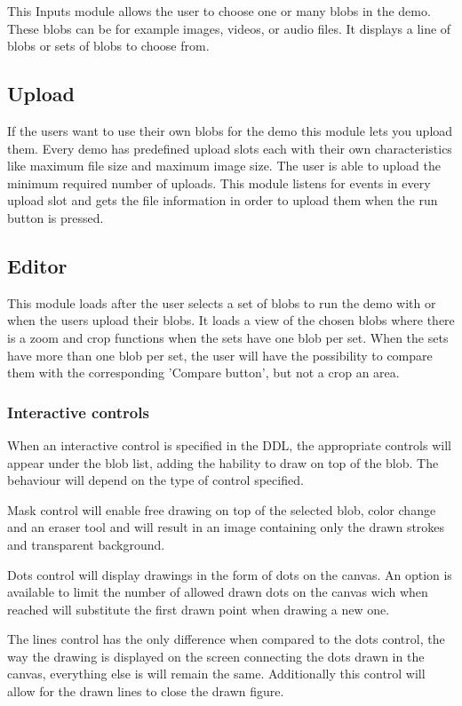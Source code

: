 This Inputs module allows the user to choose one or many blobs in the demo. These blobs can be for example images, videos, or audio files. It displays a line of blobs or sets of blobs to choose from.


\subsection{Upload}
If the users want to use their own blobs for the demo this module lets you upload them. Every demo has predefined 
upload slots each with their own characteristics like maximum file size and maximum image size. The user is able to upload the 
minimum required number of uploads. This module listens for events in every upload slot and gets the file information in order to 
upload them when the run button is pressed.


\subsection{Editor}
This module loads after the user selects a set of blobs to run the demo with or when the users upload their blobs. It loads a view of
the chosen blobs where there is a zoom and crop functions when the sets have one blob per set. When the sets have more than 
one blob per set, the user will have the possibility to compare them with the corresponding 'Compare button', but not a crop 
an area.

\subsubsection{Interactive controls}
When an interactive control is specified in the DDL, the appropriate controls will appear under the blob list, adding the hability to draw on top of the blob. The behaviour will depend on the type of control specified. 

Mask control will enable free drawing on top of the selected blob, color change and an eraser tool and will result in an image containing only the drawn strokes and transparent background.

Dots control will display drawings in the form of dots on the canvas. An option is available to limit the number of allowed drawn dots on the canvas wich when reached will substitute the first drawn point when drawing a new one.

The lines control has the only difference when compared to the dots control,  the way the drawing is displayed on the screen connecting the dots drawn in the canvas, everything else is will remain the same. Additionally this control will allow for the drawn lines to close the drawn figure.

